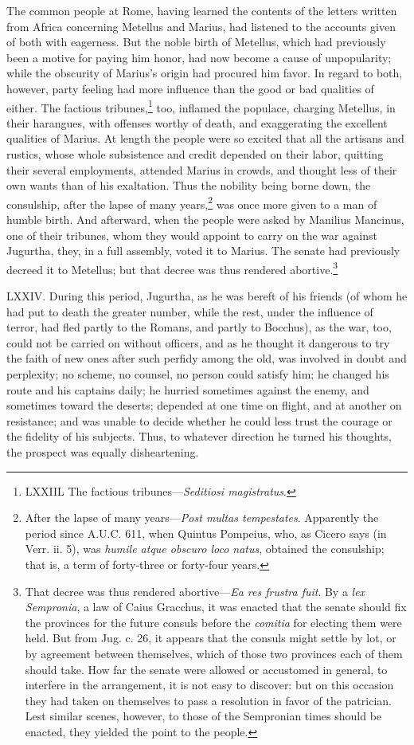 The common people at Rome, having learned the contents of the letters
written from Africa concerning Metellus and Marius, had listened to
the accounts given of both with eagerness. But the noble birth of
Metellus, which had previously been a motive for paying him honor, had
now become a cause of unpopularity; while the obscurity of Marius's
origin had procured him favor. In regard to both, however, party
feeling had more influence than the good or bad qualities of either.
The factious tribunes,\footnote{LXXIIL The factious tribunes—\emph{Seditiosi magistratus}.} too, inflamed the populace, charging
Metellus, in their harangues, with offenses worthy of death, and
exaggerating the excellent qualities of Marius. At length the people
were so excited that all the artisans and rustics, whose whole
subsistence and credit depended on their labor, quitting their several
employments, attended Marius in crowds, and thought less of their own
wants than of his exaltation. Thus the nobility being borne down, the
consulship, after the lapse of many years,\footnote{After the lapse of many years—\emph{Post multas tempestates}.
Apparently the period since A.U.C. 611, when Quintus Pompeius, who, as
Cicero says (in Verr. ii. 5), was \emph{humile atque obscuro loco natus},
obtained the consulship; that is, a term of forty-three or forty-four
years.} was once more given to
a man of humble birth. And afterward, when the people were asked by
Manilius Mancinus, one of their tribunes, whom they would appoint to
carry on the war against Jugurtha, they, in a full assembly, voted it
to Marius. The senate had previously decreed it to Metellus; but that
decree was thus rendered abortive.\footnote{That decree was thus rendered abortive—\emph{Ea res frustra fuit}.
By a \emph{lex Sempronia}, a law of Caius Gracchus, it was enacted that the
senate should fix the provinces for the future consuls before the
\emph{comitia} for electing them were held. But from Jug. c. 26, it appears
that the consuls might settle by lot, or by agreement between
themselves, which of those two provinces each of them should take. How
far the senate were allowed or accustomed in general, to interfere in
the arrangement, it is not easy to discover: but on this occasion they
had taken on themselves to pass a resolution in favor of the patrician.
Lest similar scenes, however, to those of the Sempronian times should
be enacted, they yielded the point to the people.}

LXXIV. During this period, Jugurtha, as he was bereft of his friends
(of whom he had put to death the greater number, while the rest, under
the influence of terror, had fled partly to the Romans, and partly to
Bocchus), as the war, too, could not be carried on without officers,
and as he thought it dangerous to try the faith of new ones after such
perfidy among the old, was involved in doubt and perplexity; no
scheme, no counsel, no person could satisfy him; he changed his route
and his captains daily; he hurried sometimes against the enemy, and
sometimes toward the deserts; depended at one time on flight, and at
another on resistance; and was unable to decide whether he could less
trust the courage or the fidelity of his subjects. Thus, to whatever
direction he turned his thoughts, the prospect was equally
disheartening.

